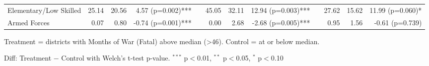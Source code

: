 \begin{table}[htbp]
\begin{tabular}{l rrr c rrr c rrr}
\quad Elementary/Low Skilled & 25.14 & 20.56 & 4.57 (p=0.002)*** &  & 45.05 & 32.11 & 12.94 (p=0.003)*** &  & 27.62 & 15.62 & 11.99 (p=0.060)* \\
\quad Armed Forces & 0.07 & 0.80 & -0.74 (p=0.001)*** &  & 0.00 & 2.68 & -2.68 (p=0.005)*** &  & 0.95 & 1.56 & -0.61 (p=0.739) \\
\bottomrule
\end{tabular}
\begin{tablenotes}
\small
\item Treatment = districts with Months of War (Fatal) above median (>46). Control = at or below median.
\item Diff: Treatment $-$ Control with Welch's t-test p-value. $^{{***}}$ p$<$0.01, $^{{**}}$ p$<$0.05, $^{{*}}$ p$<$0.10
\end{tablenotes}
\end{table}

\clearpage

